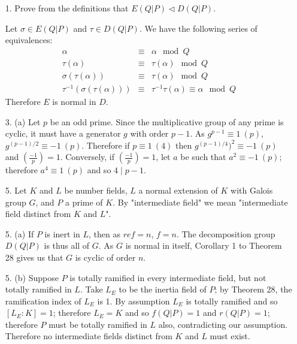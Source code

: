 \documentclass{article}
\newcommand{\modequiv}[3]{#1 \equiv #2\ (#3)}
\begin{document}
\begin{enumerate}
    \item [1.] Prove from the definitions that $E(Q|P) \triangleleft D(Q|P)$.

    Let $\sigma \in E(Q|P)$ and $\tau \in D(Q|P)$.  We have the following series of equivalences:
    \begin{eqnarray*}
        \alpha &\equiv& \alpha\mod Q \\
        \tau(\alpha) &\equiv& \tau(\alpha)\mod Q\\
        \sigma(\tau(\alpha)) &\equiv& \tau(\alpha) \mod Q\\
        \tau^{-1}(\sigma(\tau(\alpha))) &\equiv& \tau^{-1}\tau(\alpha) \equiv \alpha\mod Q
    \end{eqnarray*}
    Therefore $E$ is normal in $D$.

    \item[3. (a)]
    Let $p$ be an odd prime.  Since the multiplicative group of any prime is cyclic, it must have a generator $g$ with order $p - 1$.  As $\modequiv{g^{p-1}}{1}{p}$, $\modequiv{g^{(p-1)/2}}{-1}{p}$.  Therefore if $\modequiv{p}{1}{4}$ then $\modequiv{g^{(p-1)/4})^2}{-1}{p}$ and $\left(\frac{-1}{p}\right) = 1$.  Conversely, if $\left(\frac{-1}{p}\right) = 1$, let $a$ be such that $\modequiv{a^2}{-1}{p}$; therefore $\modequiv{a^4}{1}{p}$ and so $4 \mid p - 1$.


    \item [5.] Let $K$ and $L$ be number fields, $L$ a normal extension of $K$ with Galois group $G$, and $P$ a prime of $K$.  By "intermediate field" we mean "intermediate field distinct from $K$ and $L$".

    \item [5. (a)] If $P$ is inert in $L$, then as $ref = n$, $f = n$.  The decomposition group $D(Q|P)$ is thus all of $G$.  As $G$ is normal in itself, Corollary 1 to Theorem 28 gives us that $G$ is cyclic of order $n$.
    \item [5. (b)] Suppose $P$ is totally ramified in every intermediate field, but not totally ramified in $L$.  Take $L_E$ to be the inertia field of $P$; by Theorem 28, the ramification index of $L_{E}$ is 1.  By assumption $L_{E}$ is totally ramified and so $[L_{E} : K] = 1$; therefore $L_{E} = K$ and so $f(Q|P) = 1$ and $r(Q|P) = 1$; therefore $P$ must be totally ramified in $L$ also, contradicting our assumption.  Therefore no intermediate fields distinct from $K$ and $L$ must exist.


\end{enumerate}
\end{document}
